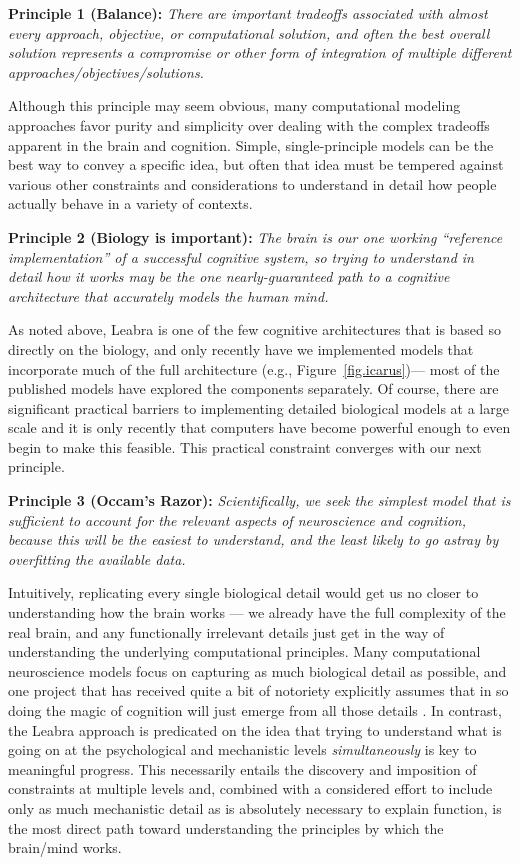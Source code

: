 \documentclass[11pt,twoside]{article}
\begin{document}
{\bf Principle 1 (Balance):} {\em There are important tradeoffs associated
  with almost every approach, objective, or computational solution, and often
  the best overall solution represents a compromise or other form of
  integration of multiple different approaches/objectives/solutions.}

Although this principle may seem obvious, many computational modeling
approaches favor purity and simplicity over dealing with the complex tradeoffs
apparent in the brain and cognition.  Simple, single-principle models can be
the best way to convey a specific idea, but often that idea must be tempered
against various other constraints and considerations to understand in detail
how people actually behave in a variety of contexts.

{\bf Principle 2 (Biology is important):} {\em The brain is our one working
  ``reference implementation'' of a successful cognitive system, so trying to
  understand in detail how it works may be the one nearly-guaranteed path to a
  cognitive architecture that accurately models the human mind.}

As noted above, Leabra is one of the few cognitive architectures that is based
so directly on the biology, and only recently have we implemented models that
incorporate much of the full architecture (e.g., Figure~\ref{fig.icarus})---
most of the published models have explored the components separately.  Of
course, there are significant practical barriers to implementing detailed
biological models at a large scale and it is only recently that computers have
become powerful enough to even begin to make this feasible.  This practical
constraint converges with our next principle.

{\bf Principle 3 (Occam's Razor):} {\em Scientifically, we seek the simplest
  model that is sufficient to account for the relevant aspects of neuroscience
  and cognition, because this will be the easiest to understand, and the least
  likely to go astray by overfitting the available data.}

Intuitively, replicating every single biological detail would get us no closer
to understanding how the brain works --- we already have the full complexity
of the real brain, and any functionally irrelevant details just get in the way
of understanding the underlying computational principles.  Many computational
neuroscience models focus on capturing as much biological detail as possible,
and one project that has received quite a bit of notoriety explicitly assumes
that in so doing the magic of cognition will just emerge from all those
details \cite{Markram06}.  In contrast, the Leabra approach is
predicated on the idea that trying to understand what is going on at
the psychological and mechanistic levels {\em simultaneously} is key to
meaningful progress. This necessarily entails the discovery and imposition of
constraints at multiple levels and, combined with a considered effort to
include only as much mechanistic detail as is absolutely necessary to explain
function, is the most direct path toward understanding the principles by which
the brain/mind works.
\end{document}
